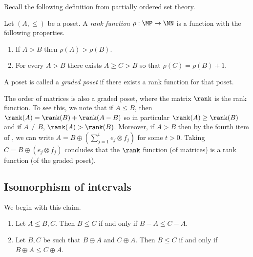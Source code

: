 \begin{remark}
Recall the following definition from partially ordered set theory.
\begin{definition}
    Let \((A,\leq)\) be a poset. A \emph{rank function} \(\rho:\MP \to \NN\) is a function with the following properties.
\begin{enumerate}
    \item If \(A > B\) then \(\rho(A) > \rho(B)\).
    \item For every \(A > B\) there exists \(A \geq C > B\) so that \(\rho(C) = \rho(B) + 1\).
\end{enumerate}
A poset is called a \emph{graded poset} if there exists a rank function for that poset.
\end{definition}
The order of matrices is also a graded poset, where the matrix \(\rank\) is the rank function. To see this, we note that if \(A \leq B\), then \(\rank(A) = \rank(B) + \rank(A-B)\) so in particular \(\rank(A) \geq \rank(B)\) and if \(A \ne B\), \(\rank(A) > \rank(B)\). Moreover, if \(A > B\) then by the fourth item of , we can write \(A = B \oplus \left ( \sum_{j=1}^t e_j \otimes f_j \right )\) for some \(t > 0\). Taking \(C = B \oplus (e_j \otimes f_j)\) concludes that the \(\rank\) function (of matrices) is a rank function (of the graded poset).
\end{remark}




\subsection{Isomorphism of intervals}

We begin with this claim.
\begin{claim} \label{claim:elementary}
    \begin{enumerate}
        \item Let \(A \leq B,C\). Then \(B \leq C\) if and only if \(B-A \leq C-A\).
        \item Let \(B,C\) be such that \(B \oplus A\) and \(C \oplus A\). Then \(B \leq C\) if and only if \(B \oplus A \leq C \oplus A\).
    \end{enumerate}
\end{claim}


